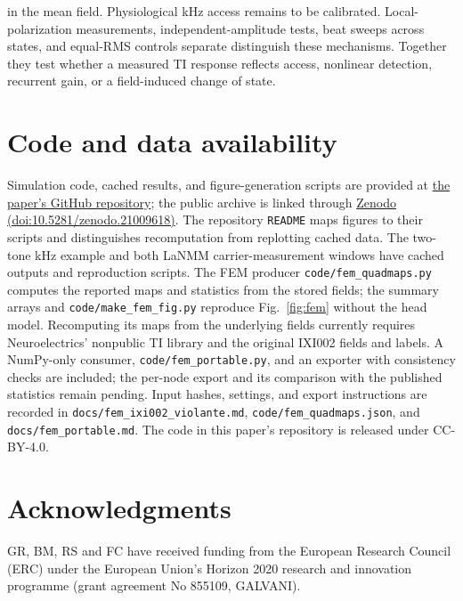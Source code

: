 \documentclass[11pt,a4paper]{article}
\providecommand{\DIFaddtex}[1]{{\protect\color{blue} \sf #1}} %
\providecommand{\DIFdeltex}[1]{{\protect\color{red} \scriptsize #1}} %
\providecommand{\DIFaddbegin}{} %
\providecommand{\DIFaddend}{} %
\providecommand{\DIFdelbegin}{} %
\providecommand{\DIFdelend}{} %
\providecommand{\DIFadd}[1]{\texorpdfstring{\DIFaddtex{#1}}{#1}} %
\providecommand{\DIFdel}[1]{\texorpdfstring{\DIFdeltex{#1}}{}} %
\begin{document}
\DIFdelend \DIFaddbegin \DIFadd{in the mean field. Physiological kHz access remains
to be calibrated. }\DIFaddend Local-polarization measurements, independent-amplitude tests,
beat sweeps across states, and equal-RMS controls \DIFdelbegin \DIFdel{separate }\DIFdelend \DIFaddbegin \DIFadd{distinguish }\DIFaddend these mechanisms.
\DIFdelbegin \DIFdel{Together they test whether a measured TI response reflects access,
nonlinear detection, recurrent gain, or a field-induced change of state.
}\DIFdelend

\section*{Code and data availability}
Simulation code, cached results, and figure-generation scripts are provided at
\href{https://github.com/giulioruffini/TI-demodulation-paper}{the paper's GitHub repository};
the public archive is linked through
\href{https://doi.org/10.5281/zenodo.21009618}{Zenodo (doi:10.5281/zenodo.21009618)}.
The repository \texttt{README} maps figures to their scripts and distinguishes
recomputation from replotting cached data. The two-tone kHz example and both LaNMM carrier-measurement windows have
cached outputs and reproduction scripts. The FEM producer \texttt{code/fem\_quadmaps.py} computes the reported maps
and statistics from the stored fields; the summary arrays and
\texttt{code/make\_fem\_fig.py} reproduce Fig.~\ref{fig:fem} without the head model. Recomputing its maps
from the underlying fields currently requires Neuroelectrics' nonpublic
TI library and the original IXI002 fields and labels. A NumPy-only consumer,
\texttt{code/fem\_portable.py}, and an exporter with consistency checks are included;
the per-node export and its comparison with the published statistics remain
pending. Input hashes, settings, and export instructions are recorded in
\texttt{docs/fem\_ixi002\_violante.md}, \texttt{code/fem\_quadmaps.json},
and \texttt{docs/fem\_portable.md}.
The code in this paper's repository is released under CC-BY-4.0.

\section*{Acknowledgments}
GR, BM, RS and FC have received funding from the European Research Council (ERC) under the
European Union's Horizon 2020 research and innovation programme (grant agreement No 855109,
GALVANI).
\end{document}
